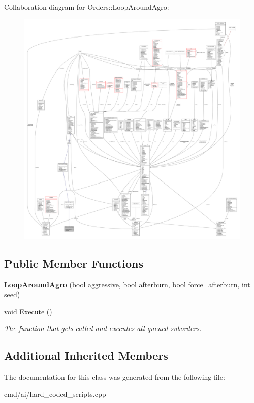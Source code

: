 Collaboration diagram for Orders\+:\+:Loop\+Around\+Agro\+:
\nopagebreak
\begin{figure}[H]
\begin{center}
\leavevmode
\includegraphics[width=350pt]{d6/d03/classOrders_1_1LoopAroundAgro__coll__graph}
\end{center}
\end{figure}
\subsection*{Public Member Functions}
\begin{DoxyCompactItemize}
\item 
{\bfseries Loop\+Around\+Agro} (bool aggressive, bool afterburn, bool force\+\_\+afterburn, int seed)\hypertarget{classOrders_1_1LoopAroundAgro_abfd9578247eb1abfa663d90eeddfad52}{}\label{classOrders_1_1LoopAroundAgro_abfd9578247eb1abfa663d90eeddfad52}

\item 
void \hyperlink{classOrders_1_1LoopAroundAgro_a84fd0a9e64f5ff0a32eb5cdc8833bcb7}{Execute} ()\hypertarget{classOrders_1_1LoopAroundAgro_a84fd0a9e64f5ff0a32eb5cdc8833bcb7}{}\label{classOrders_1_1LoopAroundAgro_a84fd0a9e64f5ff0a32eb5cdc8833bcb7}

\begin{DoxyCompactList}\small\item\em The function that gets called and executes all queued suborders. \end{DoxyCompactList}\end{DoxyCompactItemize}
\subsection*{Additional Inherited Members}


The documentation for this class was generated from the following file\+:\begin{DoxyCompactItemize}
\item 
cmd/ai/hard\+\_\+coded\+\_\+scripts.\+cpp\end{DoxyCompactItemize}
